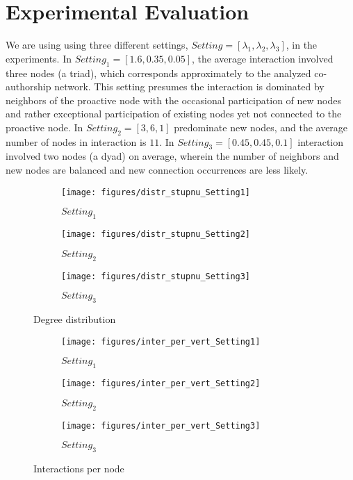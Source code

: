 \section{Experimental Evaluation}
\label{sec:exp}
We are using using three different settings, $Setting = [\lambda_1, \lambda_2, \lambda_3]$, in the experiments. In $Setting_1 = [1.6, 0.35, 0.05]$, the average interaction involved three nodes (a triad), which corresponds approximately to the analyzed co-authorship network. This setting presumes the interaction is dominated by neighbors of the proactive node with the occasional participation of new nodes and rather exceptional participation of existing nodes yet not connected to the proactive node. In $Setting_2 = [3, 6, 1]$ predominate new nodes, and the average number of nodes in interaction is $11$. In $Setting_3 = [0.45, 0.45, 0.1]$ interaction involved two nodes (a dyad) on average, wherein the number of neighbors and new nodes are balanced and new connection occurrences are less likely.

\begin{figure}[ht]
	\centering
  \begin{subfigure}{2.7cm}
    \centering\texttt{[image: figures/distr\_stupnu\_Setting1]}
    \caption{$Setting_1$}
  \end{subfigure}
  \begin{subfigure}{2.7cm}
    \centering\texttt{[image: figures/distr\_stupnu\_Setting2]}
    \caption{$Setting_2$}
		  \end{subfigure}
   \begin{subfigure}{2.7cm}
    \centering\texttt{[image: figures/distr\_stupnu\_Setting3]}
    \caption{$Setting_3$}
  \end{subfigure}
	\caption{Degree distribution}
\label{fig:DD}
\end{figure}

\begin{figure}[ht]
	\centering
  \begin{subfigure}{2.7cm}
    \centering\texttt{[image: figures/inter\_per\_vert\_Setting1]}
    \caption{$Setting_1$}
  \end{subfigure}
  \begin{subfigure}{2.7cm}
    \centering\texttt{[image: figures/inter\_per\_vert\_Setting2]}
    \caption{$Setting_2$}
		  \end{subfigure}
   \begin{subfigure}{2.7cm}
    \centering\texttt{[image: figures/inter\_per\_vert\_Setting3]}
    \caption{$Setting_3$}
  \end{subfigure}
	\caption{Interactions per	node}
\label{fig:IpN}
\end{figure}

